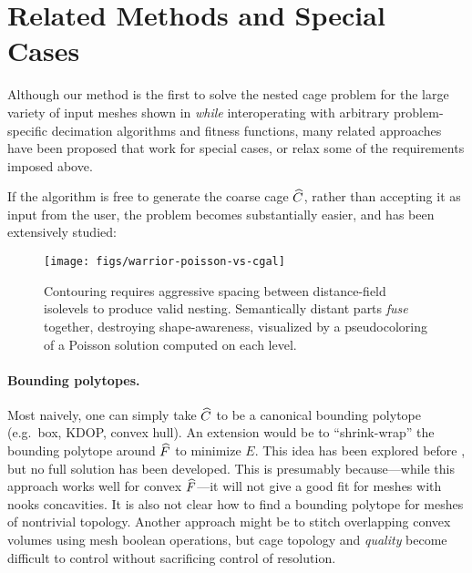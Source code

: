 \section{Related Methods and Special Cases}

Although our method is the first to solve the nested cage problem for the large
variety of input meshes shown in  \emph{while} interoperating
with arbitrary problem-specific decimation algorithms and fitness functions,
many related approaches have been proposed that work for special cases, or
relax some of the requirements imposed above.

If the algorithm is free to generate the coarse cage $\widehat{C}$, rather than
accepting it as input from the user, the problem becomes substantially easier,
and has been extensively studied:
%
\begin{figure}[b]
\texttt{[image: figs/warrior-poisson-vs-cgal]}
\caption{Contouring requires aggressive spacing between distance-field
isolevels to produce valid nesting. Semantically distant parts \emph{fuse}
together, destroying shape-awareness, visualized by a pseudocoloring of a
Poisson solution computed on each level.} \label{fig:warrior-poisson}
\end{figure}

\paragraph{Bounding polytopes.}
%
Most naively, one can simply take $\widehat{C}$ to be a canonical bounding polytope
(e.g.\ box, KDOP, convex hull). An extension would be to ``shrink-wrap'' the
bounding polytope around $\widehat{F}$ to minimize $E$. This idea has been explored
before \cite{Peterhans:2012,Wang:2013:HPE}, but no full solution has been
developed.
%
This is presumably because---while this approach works well for convex
$\widehat{F}$---it will not give a good fit for meshes with nooks concavities. It is
also not clear how to find a bounding polytope for meshes of nontrivial
topology.
%
Another approach might be to stitch overlapping convex volumes
\cite{Xian:2012tv} using mesh boolean operations, but cage topology and
\emph{quality} become difficult to control without sacrificing control of
resolution.

